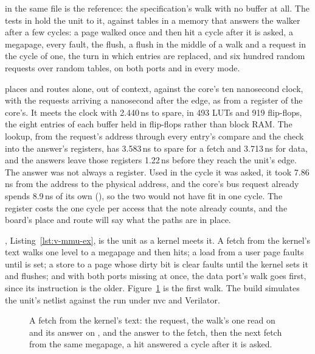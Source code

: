 \documentclass[journal,onecolumn,9pt]{IEEEtran}
\newcommand{\mmupart}[3]{%
}
\begin{document}
\mmupart{check}{The check an entry's bits must pass.}{lst:v-mmu-check}

\mmupart{walk}{The walker: the first level's entry, the answer, and
what makes it a fault.}{lst:v-mmu-walk}

 in the same file is the reference: the
specification's walk with no buffer at all. The tests in
 hold the unit to it, against tables
in a memory that answers the walker after a few cycles: a page walked
once and then hit a cycle after it is asked, a megapage, every fault,
the flush, a flush in the middle of a walk and a request in the cycle
of one, the turn in which entries are replaced, and six hundred random
requests over random tables, on both ports and in every mode.

 places and routes  alone, out of
context, against the core's ten nanosecond clock, with the requests
arriving a nanosecond after the edge, as from a register of the core's.
It meets the clock with 2.440\,ns to spare, in 493 LUTs and 919
flip-flops, the eight entries of each buffer held in flip-flops rather
than block RAM. The lookup, from the request's address through every
entry's compare and the check into the answer's registers, has
3.583\,ns to spare for a fetch and 3.713\,ns for data, and the answers
leave those registers 1.22\,ns before they reach the unit's edge. The
answer was not always a register. Used in the cycle it was asked, it
took 7.86\,ns from the address to the physical address, and the core's
bus request already spends 8.9\,ns of its own
(), so the two would not have fit in one
cycle. The register costs the one cycle per access that the note
already counts, and the board's place and route will say what the
paths are in place.

, Listing~\ref{lst:v-mmu-ex}, is the unit as a kernel
meets it. A fetch from the kernel's text walks one level to a megapage
and then hits; a load from a user page faults until  is set;
a store to a page whose dirty bit is clear faults until the kernel sets
it and flushes; and with both ports missing at once, the data port's
walk goes first, since its instruction is the older.
Figure~\ref{fig:v-mmu} is the first walk. The build simulates the
unit's netlist against the run under nvc and Verilator.

\begin{figure}[htbp]
\centering

\caption{A fetch from the kernel's text: the request, the walk's one
read on  and its answer on , and the answer to the
fetch, then the next fetch from the same megapage, a hit answered a
cycle after it is asked.}
\label{fig:v-mmu}
\end{figure}
\end{document}
